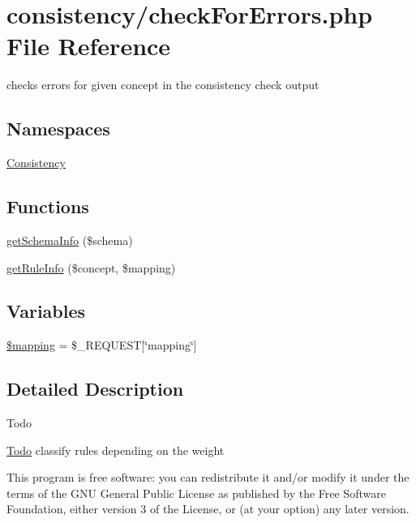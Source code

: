 \hypertarget{check_for_errors_8php}{}\section{consistency/check\+For\+Errors.php File Reference}
\label{check_for_errors_8php}


checks errors for given concept in the consistency check output  


\subsection*{Namespaces}
\begin{DoxyCompactItemize}
\item 
 \hyperlink{namespace_consistency}{Consistency}
\end{DoxyCompactItemize}
\subsection*{Functions}
\begin{DoxyCompactItemize}
\item 
\hyperlink{namespace_consistency_a4359f5b054e4c15acb39a611e29e17c8}{get\+Schema\+Info} (\$schema)
\item 
\hyperlink{namespace_consistency_a1e0e4ba06ca24d6cd0bda99a99ce9f5d}{get\+Rule\+Info} (\$concept, \$mapping)
\end{DoxyCompactItemize}
\subsection*{Variables}
\begin{DoxyCompactItemize}
\item 
\hyperlink{namespace_consistency_a2c93d0b89d7eadb6b8dfb7c83bc991f9}{\$mapping} = \$\+\_\+\+R\+E\+Q\+U\+E\+ST\mbox{[}\char`\"{}mapping\char`\"{}\mbox{]}
\end{DoxyCompactItemize}


\subsection{Detailed Description}
\begin{DoxyRefDesc}{Todo}
\item[\hyperlink{todo__todo000002}{Todo}]classify rules depending on the weight\end{DoxyRefDesc}


This program is free software\+: you can redistribute it and/or modify it under the terms of the G\+NU General Public License as published by the Free Software Foundation, either version 3 of the License, or (at your option) any later version.

